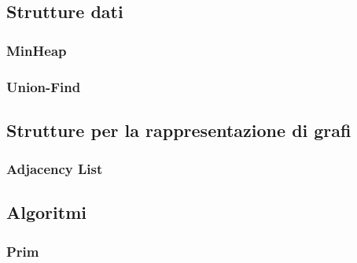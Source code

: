 \documentclass[]{article}
\begin{document}
\subsection{Strutture dati}
\subsubsection{MinHeap}
\subsubsection{Union-Find}
\subsection{Strutture per la rappresentazione di grafi}
\subsubsection{Adjacency List}
\subsection{Algoritmi}
\subsubsection{Prim}
\newpage
\end{document}
